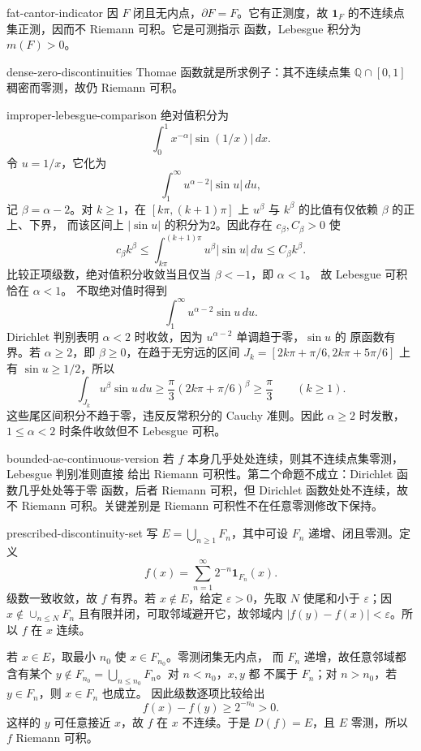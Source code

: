 \begin{solution}{fat-cantor-indicator}
因 \(F\) 闭且无内点，\(\partial F=F\)。它有正测度，故
\(\mathbf1_F\) 的不连续点集正测，因而不 Riemann 可积。它是可测指示
函数，Lebesgue 积分为 \(m(F)>0\)。
\end{solution}

\begin{solution}{dense-zero-discontinuities}
Thomae 函数就是所求例子：其不连续点集
\(\mathbb Q\cap[0,1]\) 稠密而零测，故仍 Riemann 可积。
\end{solution}

\begin{solution}{improper-lebesgue-comparison}
绝对值积分为
\[
 \int_0^1x^{-\alpha}|\sin(1/x)|\,dx.
\]
令 \(u=1/x\)，它化为
\[
 \int_1^\infty u^{\alpha-2}|\sin u|\,du,
\]
记 \(\beta=\alpha-2\)。对 \(k\ge1\)，在 \([k\pi,(k+1)\pi]\) 上
\(u^\beta\) 与 \(k^\beta\) 的比值有仅依赖 \(\beta\) 的正上、下界，
而该区间上 \(|\sin u|\) 的积分为2。因此存在 \(c_\beta,C_\beta>0\) 使
\[
 c_\beta k^\beta\le
 \int_{k\pi}^{(k+1)\pi}u^\beta|\sin u|\,du
 \le C_\beta k^\beta.
\]
比较正项级数，绝对值积分收敛当且仅当 \(\beta<-1\)，即 \(\alpha<1\)。
故 Lebesgue 可积恰在 \(\alpha<1\)。
不取绝对值时得到
\[
 \int_1^\infty u^{\alpha-2}\sin u\,du.
\]
Dirichlet 判别表明
\(\alpha<2\) 时收敛，因为 \(u^{\alpha-2}\) 单调趋于零，\(\sin u\) 的
原函数有界。若 \(\alpha\ge2\)，即 \(\beta\ge0\)，在趋于无穷远的区间
\(J_k=[2k\pi+\pi/6,2k\pi+5\pi/6]\) 上有 \(\sin u\ge1/2\)，所以
\[
 \int_{J_k}u^\beta\sin u\,du
 \ge\frac{\pi}{3}(2k\pi+\pi/6)^\beta\ge\frac\pi3
 \qquad(k\ge1).
\]
这些尾区间积分不趋于零，违反反常积分的 Cauchy 准则。因此 \(\alpha\ge2\)
时发散，\(1\le\alpha<2\) 时条件收敛但不 Lebesgue 可积。
\end{solution}

\begin{solution}{bounded-ae-continuous-version}
若 \(f\) 本身几乎处处连续，则其不连续点集零测，Lebesgue 判别准则直接
给出 Riemann 可积性。第二个命题不成立：Dirichlet 函数几乎处处等于零
函数，后者 Riemann 可积，但 Dirichlet 函数处处不连续，故不 Riemann
可积。关键差别是 Riemann 可积性不在任意零测修改下保持。
\end{solution}

\begin{solution}{prescribed-discontinuity-set}
写 \(E=\bigcup_{n\ge1}F_n\)，其中可设 \(F_n\) 递增、闭且零测。定义
\[
 f(x)=\sum_{n=1}^{\infty}2^{-n}\mathbf1_{F_n}(x).
\]
级数一致收敛，故 \(f\) 有界。若 \(x\notin E\)，给定
\(\varepsilon>0\)，先取 \(N\) 使尾和小于 \(\varepsilon\)；因
\(x\notin\cup_{n\le N}F_n\) 且有限并闭，可取邻域避开它，故邻域内
\(|f(y)-f(x)|<\varepsilon\)。所以 \(f\) 在 \(x\) 连续。

若 \(x\in E\)，取最小 \(n_0\) 使 \(x\in F_{n_0}\)。零测闭集无内点，
而 \(F_n\) 递增，故任意邻域都含有某个
\(y\notin F_{n_0}=\bigcup_{n\le n_0}F_n\)。对 \(n<n_0\)，\(x,y\) 都
不属于 \(F_n\)；对 \(n>n_0\)，若 \(y\in F_n\)，则 \(x\in F_n\) 也成立。
因此级数逐项比较给出
\[
 f(x)-f(y)\ge 2^{-n_0}>0.
\]
这样的 \(y\) 可任意接近 \(x\)，故 \(f\) 在 \(x\) 不连续。于是
\(D(f)=E\)，且 \(E\) 零测，所以 \(f\)
Riemann 可积。
\end{solution}
